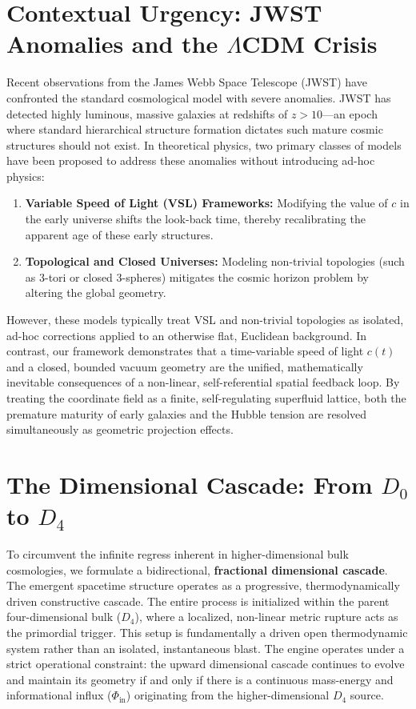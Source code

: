 \documentclass[11pt,a4paper]{article}
\theoremstyle{plain}
\theoremstyle{definition}
\theoremstyle{remark}
\begin{document}
\section{Contextual Urgency: JWST Anomalies and the $\Lambda$CDM Crisis}
Recent observations from the James Webb Space Telescope (JWST) have confronted the standard cosmological model with severe anomalies. JWST has detected highly luminous, massive galaxies at redshifts of $z > 10$—an epoch where standard hierarchical structure formation dictates such mature cosmic structures should not exist. In theoretical physics, two primary classes of models have been proposed to address these anomalies without introducing ad-hoc physics:
\begin{enumerate}
    \item \textbf{Variable Speed of Light (VSL) Frameworks:} Modifying the value of $c$ in the early universe shifts the look-back time, thereby recalibrating the apparent age of these early structures.
    \item \textbf{Topological and Closed Universes:} Modeling non-trivial topologies (such as 3-tori or closed 3-spheres) mitigates the cosmic horizon problem by altering the global geometry.
\end{enumerate}
However, these models typically treat VSL and non-trivial topologies as isolated, ad-hoc corrections applied to an otherwise flat, Euclidean background. In contrast, our framework demonstrates that a time-variable speed of light $c(t)$ and a closed, bounded vacuum geometry are the unified, mathematically inevitable consequences of a non-linear, self-referential spatial feedback loop. By treating the coordinate field as a finite, self-regulating superfluid lattice, both the premature maturity of early galaxies and the Hubble tension are resolved simultaneously as geometric projection effects.

\newpage
\section{The Dimensional Cascade: From $D_0$ to $D_4$}
To circumvent the infinite regress inherent in higher-dimensional bulk cosmologies, we formulate a bidirectional, \textbf{fractional dimensional cascade}. The emergent spacetime structure operates as a progressive, thermodynamically driven constructive cascade. The entire process is initialized within the parent four-dimensional bulk ($D_4$), where a localized, non-linear metric rupture acts as the primordial trigger. This setup is fundamentally a driven open thermodynamic system rather than an isolated, instantaneous blast. The engine operates under a strict operational constraint: the upward dimensional cascade continues to evolve and maintain its geometry if and only if there is a continuous mass-energy and informational influx ($\Phi_{\text{in}}$) originating from the higher-dimensional $D_4$ source.
\end{document}
